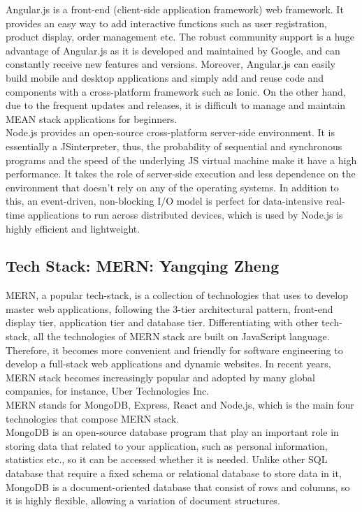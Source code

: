 \documentclass[a4paper, 11pt]{report}
\begin{document}
\noindent Angular.js is a front-end (client-side application framework) web framework. It provides an easy way to add interactive functions such as user registration, product display, order management etc. The robust community support is a huge advantage of Angular.js as it is developed and maintained by Google, and can constantly receive new features and versions. Moreover, Angular.js can easily build mobile and desktop applications and simply add and reuse code and components with a cross-platform framework such as Ionic. On the other hand, due to the frequent updates and releases, it is difficult to manage and maintain MEAN stack applications for beginners.\\

\noindent Node.js provides an open-source cross-platform server-side environment. It is essentially a JSinterpreter, thus, the probability of sequential and synchronous programs and the speed of the underlying JS virtual machine make it have a high performance. It takes the role of server-side execution and less dependence on the environment that doesn’t rely on any of the operating systems. In addition to this, an event-driven, non-blocking I/O model is perfect for data-intensive real-time applications to run across distributed devices, which is used by Node.js is highly efficient and lightweight.\\

\subsection{Tech Stack: MERN: Yangqing Zheng}

\noindent MERN, a popular tech-stack, is a collection of technologies that uses to develop master web applications, following the 3-tier architectural pattern, front-end display tier, application tier and database tier. Differentiating with other tech-stack, all the technologies of MERN stack are built on JavaScript language. Therefore, it becomes more convenient and friendly for software engineering to develop a full-stack web applications and dynamic websites. In recent years, MERN stack becomes increasingly popular and adopted by many global companies, for instance, Uber Technologies Inc.\\

\noindent MERN stands for MongoDB, Express, React and Node.js, which is the main four technologies that compose MERN stack.\\

\noindent MongoDB is an open-source database program that play an important role in storing data that related to your application, such as personal information, statistics etc., so it can be accessed whether it is needed. Unlike other SQL database that require a fixed schema or relational database to store data in it, MongoDB is a document-oriented database that consist of rows and columns, so it is highly flexible, allowing a variation of document structures.\\
\end{document}

